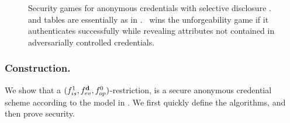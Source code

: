 \begin{figure}[ht!]
  \centering
  \caption{Security games for anonymous credentials with selective disclosure
    \cite{fhs19}. \OWNR and \ATTR tables are essentially as in \UAS. \adv~wins
    the unforgeability game if it authenticates successfully while revealing
    attributes not contained in adversarially controlled credentials.}
  \label{fig:model-ac}  
\end{figure}

\subsubsection{\CUASAC Construction.} %
We show that a $(f_{is}^1,f_{ev}^{\mathbf{d}},f_{op}^0)$-\CUASGen restriction, is
a secure anonymous credential scheme according to the model in \cite{fhs19}. We
first quickly define the algorithms, and then prove security.

